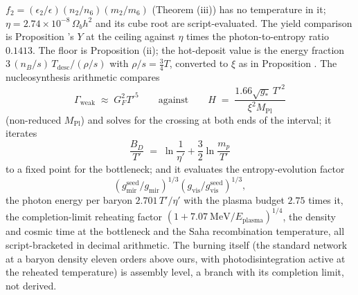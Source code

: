 $f_{2} = (\epsilon_{2}/\epsilon)(n_{2}/n_{6})(m_{2}/m_{6})$ (Theorem (iii)) has no temperature in it; $\eta = 2.74 \times 10^{-8}\,\Omega_{b}h^{2}$ and its cube root are script-evaluated. The yield comparison is Proposition 's $Y$ at the ceiling against $\eta$ times the photon-to-entropy ratio $0.1413$. The floor is Proposition (ii); the hot-deposit value is the energy fraction $3\,(n_{B}/s)\,T_{\mathrm{desc}}/(\rho/s)$ with $\rho/s = \tfrac{3}{4}T$, converted to $\xi$ as in Proposition . The nucleosynthesis arithmetic compares
\[
\Gamma_{\mathrm{weak}} \;\approx\; G_{F}^{2}T'^{5} \qquad\text{against}\qquad H \;=\; \frac{1.66\sqrt{g_{*}}\,T'^{2}}{\xi^{2}M_{\mathrm{Pl}}}
\]
(non-reduced $M_{\mathrm{Pl}}$) and solves for the crossing at both ends of the interval; it iterates
\[
\frac{B_{D}}{T'} \;=\; \ln\frac{1}{\eta'} + \frac{3}{2}\ln\frac{m_{p}}{T'}
\]
to a fixed point for the bottleneck; and it evaluates the entropy-evolution factor
\[
(g_{\mathrm{mir}}^{\mathrm{seed}}/g_{\mathrm{mir}})^{1/3}(g_{\mathrm{vis}}/g_{\mathrm{vis}}^{\mathrm{seed}})^{1/3},
\]
the photon energy per baryon $2.701\,T'/\eta'$ with the plasma budget $2.75$ times it, the completion-limit reheating factor $(1 + 7.07\ \mathrm{MeV}/E_{\mathrm{plasma}})^{1/4}$, the density and cosmic time at the bottleneck and the Saha recombination temperature, all script-bracketed in decimal arithmetic. The burning itself (the standard network at a baryon density eleven orders above ours, with photodisintegration active at the reheated temperature) is assembly level, a branch with its completion limit, not derived.
